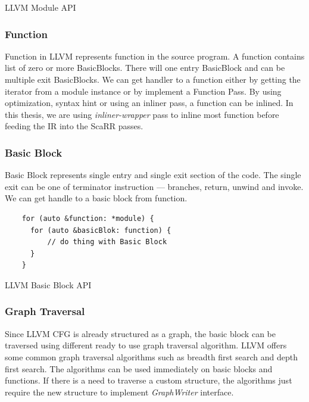 \begin{listing}
\inputminted[]{cpp}{code/module.cpp}
\caption{LLVM Module API}    
\label{listing:2-5}
\end{listing}

\subsubsection{Function}

Function in LLVM represents function in the source program. A function contains list of zero or more BasicBlocks. There will one entry BasicBlock and can be multiple exit BasicBlocks. We can get handler to a function either by getting the iterator from a module instance or by implement a Function Pass. By using optimization, syntax hint or using an inliner pass, a function can be inlined. In this thesis, we are using \emph{inliner-wrapper} pass to inline most function before feeding the IR into the ScaRR passes.

\subsubsection{Basic Block}

Basic Block represents single entry and single exit section of the code. The single exit can be one of terminator instruction — branches, return, unwind and invoke. We can get handle to a basic block from function. 

\begin{listing}
\begin{verbatim}
    for (auto &function: *module) {
      for (auto &basicBlok: function) {
          // do thing with Basic Block
      }
    }
\end{verbatim}
\caption{LLVM Basic Block API}    
\label{listing:2-6}
\end{listing}

\subsubsection{Graph Traversal}

Since LLVM CFG is already structured as a graph, the basic block can be traversed using different ready to use graph traversal algorithm. LLVM offers some common graph traversal algorithms such as breadth first search and depth first search. The algorithms can be used immediately on basic blocks and functions. If there is a need to traverse a custom structure, the algorithms just require the new structure to implement \emph{GraphWriter} interface.

